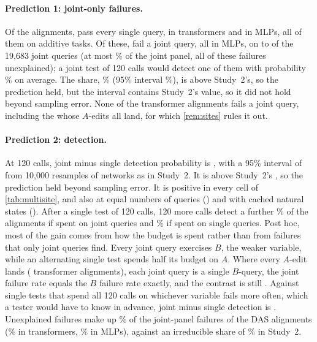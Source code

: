 \paragraph{Prediction 1: joint-only failures.}
Of the \MsAlignments{} alignments, \MsPerfect{} pass every single query, \MsPerfectTransformer{} in transformers and
\MsPerfectMlp{} in MLPs, all of them on additive tasks. Of these, \MsPerfectJointFail{} fail a joint query, all in MLPs, on
\MsJointOnlyMinFailures{} to \MsJointOnlyMaxFailures{} of the 19,683 joint queries (at most \MsJointOnlyMaxPanelShare\%
of the joint panel, all of these failures unexplained); a joint test of 120 calls would detect one of them with
probability \MsJointOnlyDetect\% on average. The share, \MsPerfectShare\% (95\% interval \MsPerfectCI\%), is above
Study~2's, so the prediction held, but the interval contains Study~2's value, so it did not hold beyond sampling
error. None of the \MsPerfectTransformer{} transformer alignments fails a joint query, including the
\MsPerfectTransformerLand{} whose $A$-edits all land, for which \cref{rem:sites} rules it out.

\paragraph{Prediction 2: detection.}
At 120 calls, joint minus single detection probability is \MsContrast, with a 95\% interval of \MsContrastCI{} from
10,000 resamples of networks as in Study~2. It is above Study~2's \TrnContrastOneTwenty, so the
prediction held beyond sampling error. It is positive in every cell of \cref{tab:multisite}, and also at equal
numbers of queries (\MsEqual) and with cached natural states (\MsCached). After a single test of 120 calls, 120 more calls
detect a further \MsAddonJoint\% of the alignments if spent on joint queries and \MsAddonSingle\% if spent on single
queries. Post hoc, most of the gain comes from how the budget is spent rather than from failures that only joint
queries find. Every joint query exercises $B$, the weaker variable, while an alternating single test spends half its
budget on $A$. Where every $A$-edit lands (\MsMechLanding{} transformer alignments), each joint query is a single
$B$-query, the joint failure rate equals the $B$ failure rate exactly, and the contrast is still
\MsMechLandingContrast. Against single tests that spend all 120 calls on whichever variable fails more often, which a
tester would have to know in advance, joint minus single detection is \MsMechWorse. Unexplained failures make up
\MsUnexplained\% of the joint-panel failures of the DAS alignments (\MsUnexplainedTransformer\% in transformers,
\MsUnexplainedMlp\% in MLPs), against an irreducible share of \TrnIrrShare\% in Study~2.

